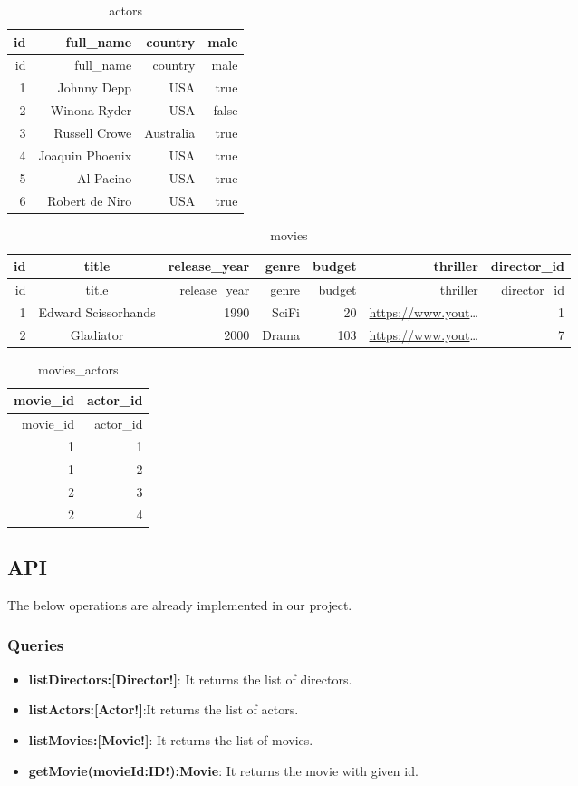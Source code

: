 \documentclass[]{book}
\providecommand{\tightlist}{%
  \setlength{\itemsep}{0pt}\setlength{\parskip}{0pt}}
\begin{document}
\begin{longtable}[]{@{}rrrr@{}}
\caption{actors}\tabularnewline
\toprule
id & full\_name & country & male\tabularnewline
\midrule
\endfirsthead
\toprule
id & full\_name & country & male\tabularnewline
\midrule
\endhead
1 & Johnny Depp & USA & true\tabularnewline
2 & Winona Ryder & USA & false\tabularnewline
3 & Russell Crowe & Australia & true\tabularnewline
4 & Joaquin Phoenix & USA & true\tabularnewline
5 & Al Pacino & USA & true\tabularnewline
6 & Robert de Niro & USA & true\tabularnewline
\bottomrule
\end{longtable}

\begin{longtable}[]{@{}rcrrrrr@{}}
\caption{movies}\tabularnewline
\toprule
id & title & release\_year & genre & budget & thriller &
director\_id\tabularnewline
\midrule
\endfirsthead
\toprule
id & title & release\_year & genre & budget & thriller &
director\_id\tabularnewline
\midrule
\endhead
1 & Edward Scissorhands & 1990 & SciFi & 20 &
\url{https://www.yout}\ldots{} & 1\tabularnewline
2 & Gladiator & 2000 & Drama & 103 & \url{https://www.yout}\ldots{} &
7\tabularnewline
\bottomrule
\end{longtable}

\begin{longtable}[]{@{}rr@{}}
\caption{movies\_actors}\tabularnewline
\toprule
movie\_id & actor\_id\tabularnewline
\midrule
\endfirsthead
\toprule
movie\_id & actor\_id\tabularnewline
\midrule
\endhead
1 & 1\tabularnewline
1 & 2\tabularnewline
2 & 3\tabularnewline
2 & 4\tabularnewline
\bottomrule
\end{longtable}

\subsection{API}\label{api}

The below operations are already implemented in our project.

\subsubsection{Queries}\label{queries}

\begin{itemize}
\tightlist
\item
  \textbf{listDirectors:{[}Director!{]}}: It returns the list of
  directors.
\item
  \textbf{listActors:{[}Actor!{]}}:It returns the list of actors.
\item
  \textbf{listMovies:{[}Movie!{]}}: It returns the list of movies.
\item
  \textbf{getMovie(movieId:ID!):Movie}: It returns the movie with given
  id.
\end{itemize}
\end{document}

